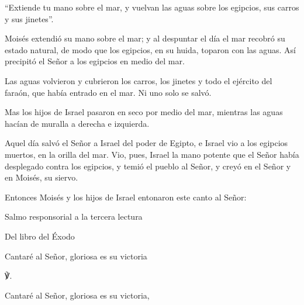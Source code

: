 			\begin{readtalk}“Extiende tu mano sobre el mar, y vuelvan las aguas sobre los egipcios, sus carros y sus jinetes”. \end{readtalk}
			
			\begin{readbody}Moisés extendió su mano sobre el mar; y al despuntar el día el mar recobró su estado natural, de modo que los egipcios, en su huida, toparon con las aguas. Así precipitó el Señor a los egipcios en medio del mar. \end{readbody}
			
			\begin{readbody}Las aguas volvieron y cubrieron los carros, los jinetes y todo el ejército del faraón, que había entrado en el mar. Ni uno solo se salvó. \end{readbody}
			
			\begin{readbody}Mas los hijos de Israel pasaron en seco por medio del mar, mientras las aguas hacían de muralla a derecha e izquierda. \end{readbody}
			
			\begin{readbody}Aquel día salvó el Señor a Israel del poder de Egipto, e Israel vio a los egipcios muertos, en la orilla del mar. Vio, pues, Israel la mano potente que el Señor había desplegado contra los egipcios, y temió el pueblo al Señor, y creyó en el Señor y en Moisés, su siervo. \end{readbody}
			
			\begin{readbody}Entonces Moisés y los hijos de Israel entonaron este canto al Señor:\end{readbody}
			
			\begin{readtitle}Salmo responsorial a la tercera lectura\end{readtitle}
			
			\begin{readbook}Del libro del Éxodo \end{readbook}
			
			\begin{readtheme}Cantaré al Señor, gloriosa es su victoria\end{readtheme}
			
			\begin{readbody}\begin{readred}℣.\end{readred} Cantaré al Señor, gloriosa es su victoria, \end{readbody}
			
